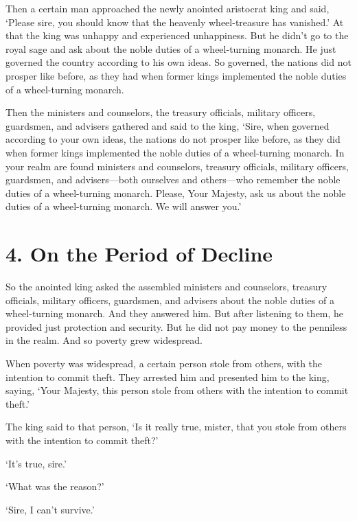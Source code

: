 \documentclass[12pt,openany]{book}%
\begin{document}
Then a certain man approached the newly anointed aristocrat king and said, ‘Please sire, you should know that the heavenly wheel-treasure has vanished.’ At that the king was unhappy and experienced unhappiness. But he didn’t go to the royal sage and ask about the noble duties of a wheel-turning monarch. He just governed the country according to his own ideas. So governed, the nations did not prosper like before, as they had when former kings implemented the noble duties of a wheel-turning monarch. 

Then the ministers and counselors, the treasury officials, military officers, guardsmen, and advisers gathered and said to the king, ‘Sire, when governed according to your own ideas, the nations do not prosper like before, as they did when former kings implemented the noble duties of a wheel-turning monarch. In your realm are found ministers and counselors, treasury officials, military officers, guardsmen, and advisers—both ourselves and others—who remember the noble duties of a wheel-turning monarch. Please, Your Majesty, ask us about the noble duties of a wheel-turning monarch. We will answer you.’ 

\section*{4. On the Period of Decline }

So the anointed king asked the assembled ministers and counselors, treasury officials, military officers, guardsmen, and advisers about the noble duties of a wheel-turning monarch. And they answered him. But after listening to them, he provided just protection and security. But he did not pay money to the penniless in the realm. And so poverty grew widespread. 

When poverty was widespread, a certain person stole from others, with the intention to commit theft. They arrested him and presented him to the king, saying, ‘Your Majesty, this person stole from others with the intention to commit theft.’ 

The king said to that person, ‘Is it really true, mister, that you stole from others with the intention to commit theft?’ 

‘It’s true, sire.’ 

‘What was the reason?’ 

‘Sire, I can’t survive.’ 
\end{document}
